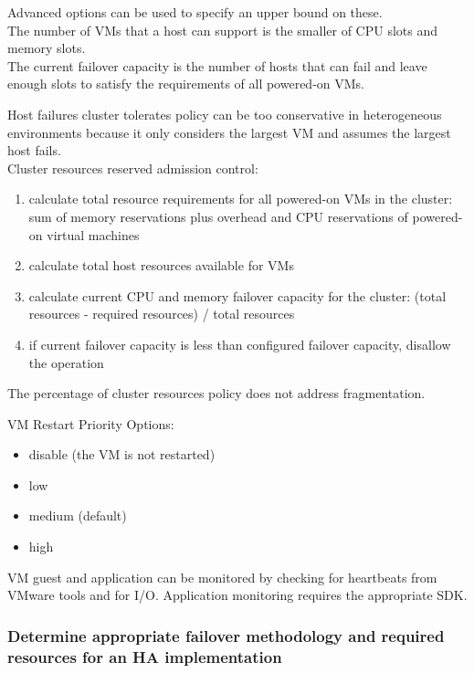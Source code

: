 Advanced options can be used to specify an upper bound on these.\\

The number of VMs that a host can support is the smaller of CPU slots and
memory slots.\\

The current failover capacity is the number of hosts that can
fail and leave enough slots to satisfy the requirements of all powered-on
VMs.

Host failures cluster tolerates policy can be too conservative in
heterogeneous environments because it only considers the largest VM and assumes
the largest host fails.\\

Cluster resources reserved admission control:

\begin{enumerate}

\item calculate total resource requirements for all powered-on VMs in the
cluster: sum of memory reservations plus overhead and CPU reservations of
powered-on virtual machines

\item calculate total host resources available for VMs

\item calculate current CPU and memory failover capacity for the cluster:
(total resources - required resources) / total resources

\item if current failover capacity is less than configured failover capacity,
disallow the operation

\end{enumerate}

The percentage of cluster resources policy does not address fragmentation.

VM Restart Priority Options:

\begin{itemize}
\item disable (the VM is not restarted)
\item low
\item medium (default)
\item high
\end{itemize}

VM guest and application can be monitored by checking for heartbeats from
VMware tools and for I/O. Application monitoring requires the appropriate SDK.

\subsubsection{Determine appropriate failover methodology and required resources for an HA implementation}
